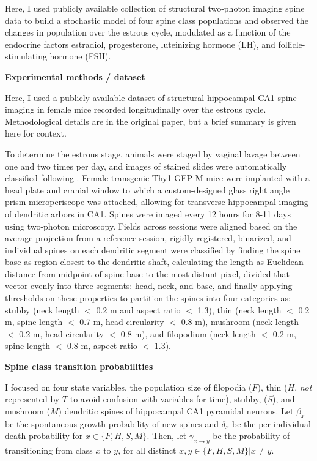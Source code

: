 \documentclass[11pt]{article}
\begin{document}
Here, I used publicly available collection of structural two-photon imaging spine data \cite{nora} to build a stochastic model of four spine class populations and observed the changes in population over the estrous cycle, modulated as a function of the endocrine factors estradiol, progesterone, luteinizing hormone (LH), and follicle-stimulating hormone (FSH).

\vspace{10pt}

\noindent \textbf{Experimental methods / dataset}

Here, I used a publicly available dataset of structural hippocampal CA1 spine imaging in female mice recorded longitudinally over the estrous cycle\cite{nora}. Methodological details are in the original paper, but a brief summary is given here for context.

To determine the estrous stage, animals were staged by vaginal lavage between one and two times per day, and images of stained slides were automatically classified following \cite{estrousnet}. Female transgenic Thy1-GFP-M mice were implanted with a head plate and cranial window to which a custom-designed glass right angle prism microperiscope was attached, allowing for transverse hippocampal imaging of dendritic arbors in CA1. Spines were imaged every 12 hours for 8-11 days using two-photon microscopy. Fields across sessions were aligned based on the average projection from a reference session, rigidly registered, binarized, and individual spines on each dendritic segment were classified by finding the spine base as region closest to the dendritic shaft, calculating the length as Euclidean distance from midpoint of spine base to the most distant pixel, divided that vector evenly into three segments: head, neck, and base, and finally applying thresholds on these properties to partition the spines into four categories as: stubby (neck length $<$ 0.2 \textmu m and aspect ratio $<$ 1.3), thin (neck length $<$ 0.2 \textmu m, spine length $<$ 0.7 \textmu m, head circularity $<$ 0.8 \textmu m), mushroom (neck length $<$ 0.2 \textmu m, head circularity $<$ 0.8 \textmu m), and filopodium (neck length $<$ 0.2 \textmu m, spine length $<$ 0.8 \textmu m, aspect ratio $<$ 1.3).

\vspace{10pt}
\noindent \textbf{Spine class transition probabilities}

I focused on four state variables, the population size of filopodia ($F$), thin ($H$, \textit{not} represented by $T$ to avoid confusion with variables for time), stubby, ($S$), and mushroom ($M$) dendritic spines of hippocampal CA1 pyramidal neurons. Let $\beta_x$ be the spontaneous growth probability of new spines and $\delta_x$ be the per-individual death probability for $x \in \{F, H, S, M\}$. Then, let $\gamma_{x \to y}$ be the probability of transitioning from class $x$ to $y$, for all distinct $x, y \in \{F, H, S, M\} | x \neq y$.
\end{document}
